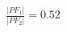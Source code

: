 \documentclass[preview]{standalone}
\begin{document}
\begin{align*}
\frac{|PF_1|}{|PF_2|} = 0.52
\end{align*}
\end{document}
